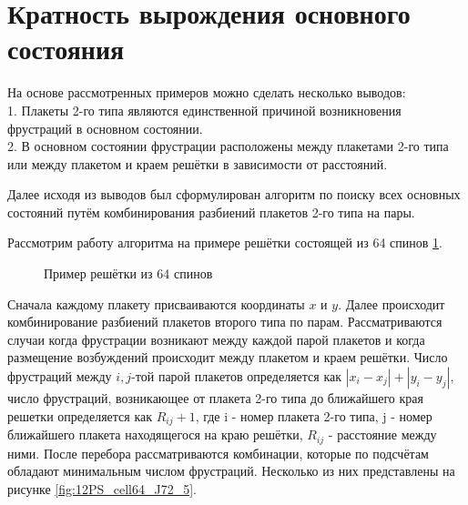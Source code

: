\documentclass[utf8, babel, sor, jor, amsmath, amssymb, reprint]{elsarticle} %
\begin{document}
\section{Кратность вырождения основного состояния}

На основе рассмотренных примеров можно сделать несколько выводов: \\
1. Плакеты 2-го типа являются единственной причиной возникновения фрустраций в основном состоянии.\\
2. В основном состоянии фрустрации расположены между плакетами 2-го типа или между плакетом и краем решётки в зависимости от расстояний.

Далее исходя из выводов был сформулирован алгоритм по поиску всех основных состояний путём комбинирования разбиений плакетов 2-го типа на пары.

Рассмотрим работу алгоритма на примере решётки состоящей из 64 спинов \ref{fig:cell64_J72_5}.

\begin{figure}[H]
	\centering
	\caption{Пример решётки из 64 спинов}
	\label{fig:cell64_J72_5}
\end{figure}

Сначала каждому плакету присваиваются координаты $x$ и $y$. Далее происходит комбинирование разбиений плакетов второго типа по парам. Рассматриваются случаи когда фрустрации возникают между каждой парой плакетов и когда размещение возбуждений происходит между плакетом и краем решётки. Число фрустраций между $i,j$-той парой плакетов определяется как $\left|x_i-x_j\right|+\left|y_i-y_j\right|$,  число фрустраций, возникающее от плакета 2-го типа до ближайшего края решетки определяется как $R_{ij}+1$, где i - номер плакета 2-го типа, j - номер ближайшего плакета находящегося на краю решётки, $R_{ij}$ - расстояние между ними. После перебора рассматриваются комбинации, которые по подсчётам обладают минимальным числом фрустраций. Несколько из них представлены на рисунке \ref{fig:12PS_cell64_J72_5}.
\end{document}
